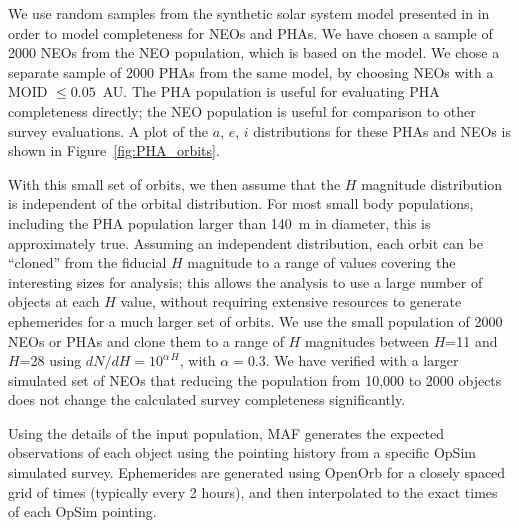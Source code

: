 We use random samples from the synthetic solar system model presented in \cite{Grav2011} in order to model completeness for NEOs and PHAs. We have chosen a sample of 2000 NEOs from the \cite{Grav2011} NEO population, which is based on the \cite{Bottke2002} model. We chose a separate sample of 2000 PHAs from the same model, by choosing NEOs with a MOID $\le 0.05$~AU. The PHA population is useful for evaluating PHA completeness directly; the NEO population is useful for comparison to other survey evaluations. A plot of the $a$, $e$, $i$ distributions for these PHAs and NEOs is shown in Figure~\ref{fig:PHA_orbits}.

With this small set of orbits, we then assume that the $H$ magnitude distribution is independent of the orbital distribution. For most small body populations, including the PHA population larger than 140~m in diameter, this is approximately true. Assuming an independent distribution, each orbit can be ``cloned'' from the fiducial $H$ magnitude to a range of values covering the interesting sizes for analysis; this allows the analysis to use a large number of objects at each $H$ value, without requiring extensive resources to generate ephemerides for a much larger set of orbits. We use the small population of 2000 NEOs or PHAs and clone them to a range of $H$ magnitudes between $H$=11 and $H$=28 using $dN/dH = 10^{\alpha\, H}$, with $\alpha=0.3$. We have verified with a larger simulated set of NEOs that reducing the population from 10,000 to 2000 objects does not change the calculated survey completeness significantly.

Using the details of the input population, MAF generates the expected observations of each object using the pointing history
from a specific OpSim simulated survey. Ephemerides are generated using OpenOrb \citep{OpenOrb2009} for a closely spaced grid
of times (typically every 2 hours), and then interpolated to the exact times of each OpSim pointing.


